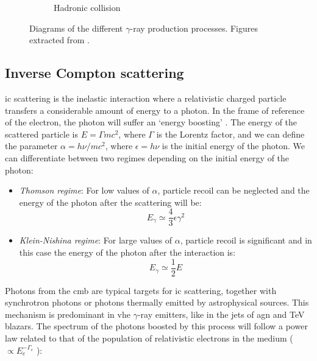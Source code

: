 \documentclass[main.tex]{subfiles}
\begin{document}
\begin{figure}[h]
\begin{subfigure}{0.31\textwidth}
\caption{Hadronic collision} \label{fig:1i} 
\end{subfigure}
\caption{Diagrams of the different $\gamma$-ray production processes. Figures extracted from \cite{OyaVallejo:2010ipa} \label{fig:gammaproductionmec}.}
\end{figure}

\subsection{Inverse Compton scattering}\label{sec:IC}

\gls{ic} scattering is the inelastic interaction where a relativistic charged particle transfers a considerable amount of energy to a photon. In the frame of reference of the electron, the photon will suffer an `energy boosting' \cite{weekes2003HEAstrophy}. The energy of the scattered particle is $E = \Gamma m c^2$, where $\Gamma$ is the Lorentz factor, and we can define the parameter $\alpha = h\nu/mc^2$, where $\epsilon = h\nu$ is the initial energy of the photon. We can differentiate between two regimes depending on the initial energy of the photon:

\begin{itemize}
    \item \textit{Thomson regime}: For low values of $\alpha$, particle recoil can be neglected and the energy of the photon after the scattering will be:
    \begin{equation}
         E_{\gamma}  \simeq \frac{4}{3}\epsilon \gamma^{2}
    \end{equation}
    
    \item \textit{Klein-Nishina regime}: For large values of $\alpha$, particle recoil is significant and in this case the energy of the photon after the interaction is:
    \begin{equation}
        E_{\gamma}  \simeq \frac{1}{2} E
    \end{equation}
\end{itemize}

Photons from the \gls{cmb} are typical targets for \gls{ic} scattering, together with synchrotron photons or photons thermally emitted by astrophysical sources. This mechanism is predominant in \gls{vhe} $\gamma$-ray emitters, like in the jets of \gls{agn} and TeV blazars. 
The spectrum of the photons boosted by this process will follow a power law related to that of the population of relativistic electrons in the medium ($\propto E_e^{-\Gamma_e}$ ):
\end{document}
